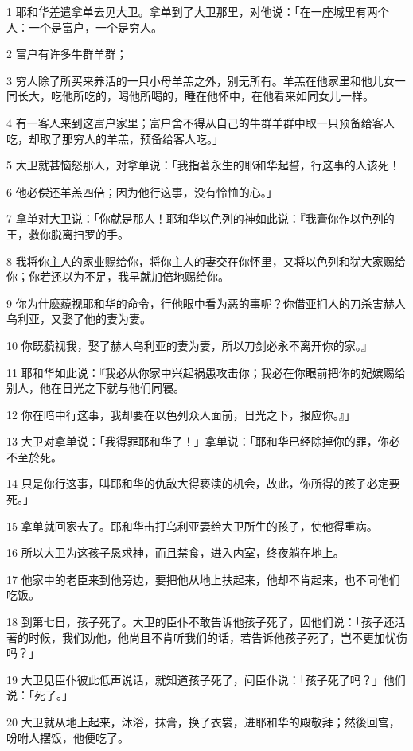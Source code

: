 \par 1 耶和华差遣拿单去见大卫。拿单到了大卫那里，对他说：「在一座城里有两个人：一个是富户，一个是穷人。
\par 2 富户有许多牛群羊群；
\par 3 穷人除了所买来养活的一只小母羊羔之外，别无所有。羊羔在他家里和他儿女一同长大，吃他所吃的，喝他所喝的，睡在他怀中，在他看来如同女儿一样。
\par 4 有一客人来到这富户家里；富户舍不得从自己的牛群羊群中取一只预备给客人吃，却取了那穷人的羊羔，预备给客人吃。」
\par 5 大卫就甚恼怒那人，对拿单说：「我指著永生的耶和华起誓，行这事的人该死！
\par 6 他必偿还羊羔四倍；因为他行这事，没有怜恤的心。」
\par 7 拿单对大卫说：「你就是那人！耶和华以色列的神如此说：『我膏你作以色列的王，救你脱离扫罗的手。
\par 8 我将你主人的家业赐给你，将你主人的妻交在你怀里，又将以色列和犹大家赐给你；你若还以为不足，我早就加倍地赐给你。
\par 9 你为什麽藐视耶和华的命令，行他眼中看为恶的事呢？你借亚扪人的刀杀害赫人乌利亚，又娶了他的妻为妻。
\par 10 你既藐视我，娶了赫人乌利亚的妻为妻，所以刀剑必永不离开你的家。』
\par 11 耶和华如此说：『我必从你家中兴起祸患攻击你；我必在你眼前把你的妃嫔赐给别人，他在日光之下就与他们同寝。
\par 12 你在暗中行这事，我却要在以色列众人面前，日光之下，报应你。』」
\par 13 大卫对拿单说：「我得罪耶和华了！」拿单说：「耶和华已经除掉你的罪，你必不至於死。
\par 14 只是你行这事，叫耶和华的仇敌大得亵渎的机会，故此，你所得的孩子必定要死。」
\par 15 拿单就回家去了。耶和华击打乌利亚妻给大卫所生的孩子，使他得重病。
\par 16 所以大卫为这孩子恳求神，而且禁食，进入内室，终夜躺在地上。
\par 17 他家中的老臣来到他旁边，要把他从地上扶起来，他却不肯起来，也不同他们吃饭。
\par 18 到第七日，孩子死了。大卫的臣仆不敢告诉他孩子死了，因他们说：「孩子还活著的时候，我们劝他，他尚且不肯听我们的话，若告诉他孩子死了，岂不更加忧伤吗？」
\par 19 大卫见臣仆彼此低声说话，就知道孩子死了，问臣仆说：「孩子死了吗？」他们说：「死了。」
\par 20 大卫就从地上起来，沐浴，抹膏，换了衣裳，进耶和华的殿敬拜；然後回宫，吩咐人摆饭，他便吃了。
